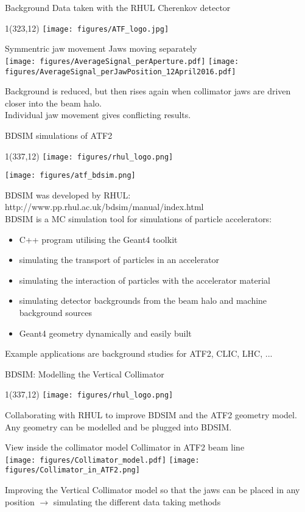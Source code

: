\documentclass[xcolor={dvipsnames}]{beamer}
\newcommand{\ATFlogo}{
  \setlength{\TPHorizModule}{1pt}
  \setlength{\TPVertModule}{1pt}
  \begin{textblock}{1}(323,12)
   \texttt{[image: figures/ATF\_logo.jpg]}
  \end{textblock}
}
\newcommand{\RHULlogo}{
  \setlength{\TPHorizModule}{1pt}
  \setlength{\TPVertModule}{1pt}
  \begin{textblock}{1}(337,12)
   \texttt{[image: figures/rhul\_logo.png]}
  \end{textblock}
}
\begin{document}
\begin{frame}{Background Data taken with the RHUL Cherenkov detector}
\ATFlogo
\begin{center}
 Symmentric jaw movement \hspace*{2.5cm} Jaws moving separately\\
\vspace*{0.2cm}
 \texttt{[image: figures/AverageSignal\_perAperture.pdf]}
  \texttt{[image: figures/AverageSignal\_perJawPosition\_12April2016.pdf]}
\end{center}
Background is reduced, but then rises again when collimator jaws are driven closer into the beam halo.\\
Individual jaw movement gives conflicting results.
\end{frame}
\begin{frame}{BDSIM simulations of ATF2}
\RHULlogo
\begin{center}
 \texttt{[image: figures/atf\_bdsim.png]}
\end{center}
BDSIM was developed by RHUL: {\small http://www.pp.rhul.ac.uk/bdsim/manual/index.html}\\
BDSIM is a MC simulation tool for simulations of particle accelerators:
\begin{itemize}
 \item C++ program utilising the Geant4 toolkit
 \item simulating the transport of particles in an accelerator
 \item simulating the interaction of particles with the accelerator material
 \item simulating detector backgrounds from the beam halo and machine background sources
 \item Geant4 geometry dynamically and easily built
\end{itemize}
Example applications are background studies for ATF2, CLIC, LHC, ...
\end{frame}

\begin{frame}{BDSIM: Modelling the Vertical Collimator}
\RHULlogo
Collaborating with RHUL to improve BDSIM and the ATF2 geometry model.\\
Any geometry can be modelled and be plugged into BDSIM.
\begin{center}
View inside the collimator model \hspace*{1cm} Collimator in ATF2 beam line\\
\vspace*{0.2cm}
 \texttt{[image: figures/Collimator\_model.pdf]}%
 \texttt{[image: figures/Collimator\_in\_ATF2.png]}
 \end{center}
 Improving the Vertical Collimator model so that the jaws can be placed in any position $\rightarrow$ simulating the different data taking methods
\end{frame}
\end{document}
